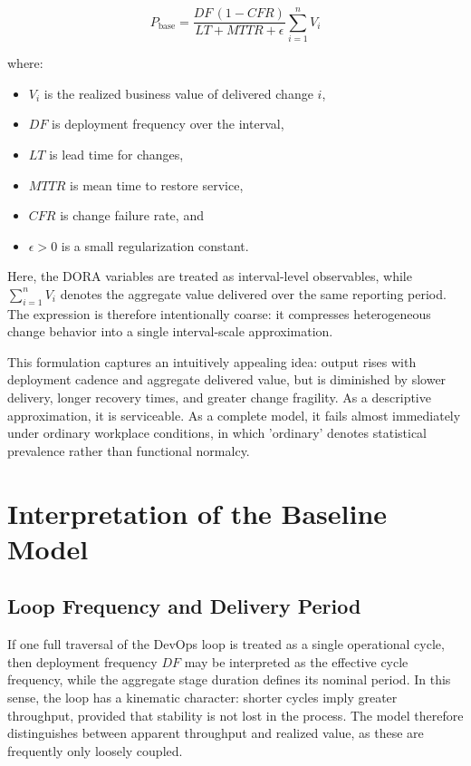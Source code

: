 \documentclass[letterpaper]{article}
\begin{document}
\begin{equation}
P_{\mathrm{base}}
=
\frac{DF\,(1-CFR)}{LT + MTTR + \epsilon}
\sum_{i=1}^{n} V_i
\end{equation}

where:
\begin{itemize}
    \item $V_i$ is the realized business value of delivered change $i$,
    \item $DF$ is deployment frequency over the interval,
    \item $LT$ is lead time for changes,
    \item $MTTR$ is mean time to restore service,
    \item $CFR$ is change failure rate, and
    \item $\epsilon > 0$ is a small regularization constant.
\end{itemize}

Here, the DORA variables are treated as interval-level observables, while $\sum_{i=1}^{n} V_i$ denotes the aggregate value delivered over the same reporting period. The expression is therefore intentionally coarse: it compresses heterogeneous change behavior into a single interval-scale approximation. 


This formulation captures an intuitively appealing idea: output rises with deployment cadence and aggregate delivered value, but is diminished by slower delivery, longer recovery times, and greater change fragility.
As a descriptive approximation, it is serviceable. As a complete model, it fails almost immediately under ordinary workplace conditions, in which 'ordinary' denotes statistical prevalence rather than functional normalcy.

\section{Interpretation of the Baseline Model}

\subsection{Loop Frequency and Delivery Period}

If one full traversal of the DevOps loop is treated as a single operational cycle, then deployment frequency $DF$ may be interpreted as the effective cycle frequency, while the aggregate stage duration defines its nominal period. In this sense, the loop has a kinematic character: shorter cycles imply greater throughput, provided that stability is not lost in the process. The model therefore distinguishes between apparent throughput and realized value, as these are frequently only loosely coupled.
\end{document}
